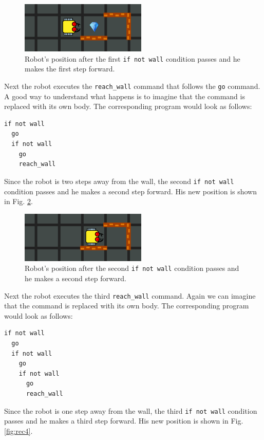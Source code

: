 \documentclass[article,A4,12pt]{llncs}
\begin{document}
{{{{\begin{figure}[!ht]
\begin{center}
\includegraphics[width=6cm]{img/rec-2.png}
\end{center}
\vspace{-4mm}
\caption{Robot's position after the first {\tt if not wall} condition passes and he makes the first step forward.}
\label{fig:rec2}
\vspace{-4mm}
\end{figure}
\noindent
Next the robot executes the {\tt reach\_wall} command that follows the {\tt go} command. A good way to 
understand what happens is to imagine that the command is replaced with its own body. The corresponding 
program would look as follows:

\begin{verbatim}
if not wall
  go
  if not wall
    go
    reach_wall
\end{verbatim}
\noindent
Since the robot is two steps away from the wall, the second {\tt if not wall} condition passes and 
he makes a second step forward. His new position is shown in Fig. \ref{fig:rec3}.

\begin{figure}[!ht]
\begin{center}
\includegraphics[width=6cm]{img/rec-3.png}
\end{center}
\vspace{-4mm}
\caption{Robot's position after the second {\tt if not wall} condition passes and he makes a second step forward.}
\label{fig:rec3}
\vspace{-4mm}
\end{figure}
\noindent
Next the robot executes the third {\tt reach\_wall} command. Again we can imagine that the command 
is replaced with its own body. The corresponding program would look as follows:

\begin{verbatim}
if not wall
  go
  if not wall
    go
    if not wall
      go
      reach_wall
\end{verbatim}
\noindent
Since the robot is one step away from the wall, the third {\tt if not wall} condition passes and 
he makes a third step forward. His new position is shown in Fig. \ref{fig:rec4}.

}}}}
\end{document}
